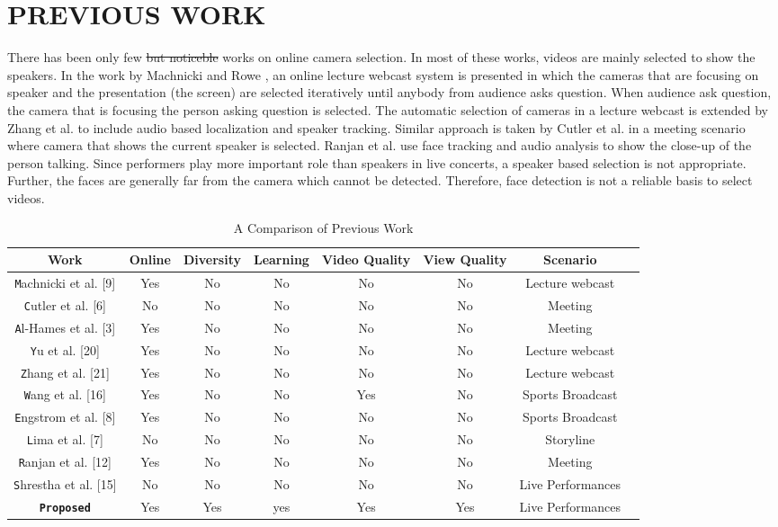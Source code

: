 \documentclass{sig-alternate}
\providecommand{\DIFdeltex}[1]{{\protect\color{red}\sout{#1}}}                      %
\providecommand{\DIFdelbegin}{} %
\providecommand{\DIFdelend}{} %
\providecommand{\DIFdel}[1]{\texorpdfstring{\DIFdeltex{#1}}{}} %
\begin{document}
\section{PREVIOUS WORK}
There has been only few \DIFdelbegin \DIFdel{but noticeble }\DIFdelend works on online camera selection. In most of these works, videos are mainly selected to show the speakers. In the work by Machnicki and Rowe \cite{9}, an online lecture webcast system is presented in which the cameras that are focusing on speaker and the presentation (the screen) are selected iteratively until anybody from audience asks question. When audience ask question, the camera that is focusing the person asking question is selected. The automatic selection of cameras in a lecture webcast is extended by Zhang et al. \cite{21} to include audio based localization and speaker tracking. Similar approach is taken by Cutler et al. \cite{6} in a meeting scenario where camera that shows the current speaker is selected. Ranjan et al. \cite{12} use face tracking and audio analysis to show the close-up of the person talking. Since performers play more important role than speakers in live concerts, a speaker based selection is not appropriate. Further, the faces are generally far from the camera which cannot be detected. Therefore, face detection is not a reliable basis to select videos.

\begin{table}
\centering
\caption{A Comparison of Previous Work}
\begin{tabular}{|c|c|c|c|c|c|c|c|} \hline
Work&Online&Diversity&Learning&Video Quality&View Quality&Scenario\\ \hline
\texttt Machnicki et al. [9]&Yes&No&No&No&No&Lecture webcast  \\ \hline 
\texttt Cutler et al. [6]&No&No&No&No&No&Meeting  \\ \hline 
\texttt Al-Hames et al. [3]&Yes&No&No&No&No&Meeting  \\ \hline 
\texttt Yu et al. [20]&Yes&No&No&No&No&Lecture webcast  \\ \hline 
\texttt Zhang et al. [21]&Yes&No&No&No&No&Lecture webcast  \\ \hline 
\texttt Wang et al. [16]&Yes&No&No&Yes&No&Sports Broadcast  \\ \hline 
\texttt Engstrom et al. [8]&Yes&No&No&No&No&Sports Broadcast  \\ \hline 
\texttt Lima et al. [7]&No&No&No&No&No&Storyline  \\ \hline 
\texttt Ranjan et al. [12]&Yes&No&No&No&No&Meeting  \\ \hline 
\texttt Shrestha et al. [15]&No&No&No&No&No&Live Performances  \\ \hline 
\texttt \textbf{Proposed}&Yes&Yes&yes&Yes&Yes&Live Performances\\ \hline
\end{tabular}
\end{table}
\end{document}
